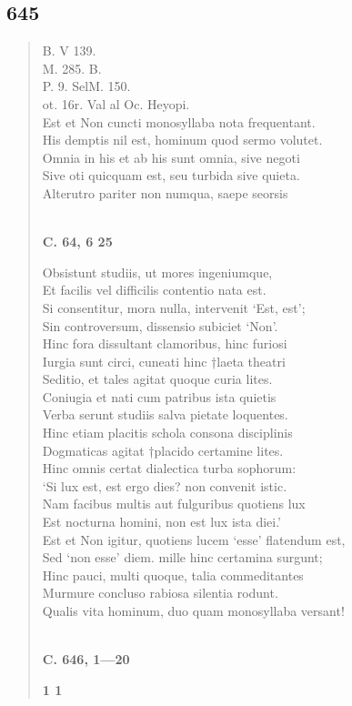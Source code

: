 \documentclass[11pt, a4paper]{report}
\begin{document}
            \subsection*{645}
      \begin{verse}
      B. V 139. \\ M. 285. B. \\ P. 9. SelM. 150. \\ ot. 16r. Val al Oc. Heyopi. \\ Est et Non cuncti monosyllaba nota frequentant. \\ His demptis nil est, hominum quod sermo volutet. \\ Omnia in his et ab his sunt omnia, sive negoti \\ Sive oti quicquam est, seu turbida sive quieta. \\ Alterutro pariter non numqua, saepe seorsis \\ 
        ﻿\pagebreak 
     \marginpar{[112]} \begin{center} \textbf{C. 64, 6 25} \end{center}Obsistunt studiis, ut mores ingeniumque, \\ Et facilis vel difficilis contentio nata est. \\ Si consentitur, mora nulla, intervenit ‘Est, est’; \\ Sin controversum, dissensio subiciet ‘Non’. \\ Hinc fora dissultant clamoribus, hinc furiosi \\ Iurgia sunt circi, cuneati hinc †laeta theatri \\ Seditio, et tales agitat quoque curia lites. \\ Coniugia et nati cum patribus ista quietis \\ Verba serunt studiis salva pietate loquentes. \\ Hinc etiam placitis schola consona disciplinis \\ Dogmaticas agitat †placido certamine lites. \\ Hinc omnis certat dialectica turba sophorum: \\ ‘Si lux est, est ergo dies? non convenit istic. \\ Nam facibus multis aut fulguribus quotiens lux \\ Est nocturna homini, non est lux ista diei.’ \\ Est et Non igitur, quotiens lucem ‘esse’ flatendum est, \\ Sed ‘non esse’ diem. mille hinc certamina surgunt; \\ Hinc pauci, multi quoque, talia commeditantes \\ Murmure concluso rabiosa silentia rodunt. \\ Qualis vita hominum, duo quam monosyllaba versant! \\ 
        ﻿\pagebreak 
    \begin{center} \textbf{C. 646, 1—20} \end{center}\begin{center} \textbf{1 1} \end{center}
      \end{verse}
  
\end{document}
